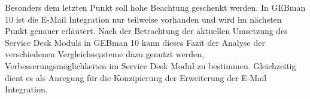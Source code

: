 \noindent
Besonders dem letzten Punkt soll hohe Beachtung geschenkt werden. In GEBman 10 ist die E-Mail Integration nur teilweise vorhanden und wird im nächsten Punkt genauer erläutert. Nach der Betrachtung der aktuellen Umsetzung des Service Desk Moduls in GEBman 10 kann dieses Fazit der Analyse der verschiedenen Vergleichssysteme dazu genutzt werden, Verbesserungsmöglichkeiten im Service Desk Modul zu bestimmen. Gleichzeitig dient es als Anregung für die Konzipierung der Erweiterung der E-Mail Integration. 
